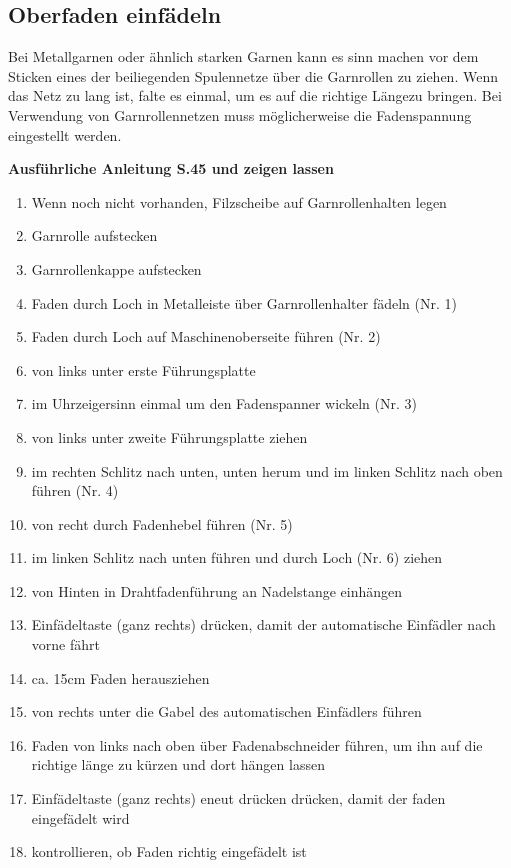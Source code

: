 \documentclass{\basedir/fablab-document}
\begin{document}
\subsection{Oberfaden einfädeln}

Bei Metallgarnen oder ähnlich starken Garnen kann es sinn machen vor dem Sticken eines der beiliegenden Spulennetze über die Garnrollen zu ziehen. Wenn das Netz zu lang ist, falte es einmal, um es auf die richtige Längezu bringen.
Bei Verwendung von Garnrollennetzen muss möglicherweise die Fadenspannung eingestellt werden.

\textbf{Ausführliche Anleitung S.45 und zeigen lassen}
\begin{enumerate}
	\item Wenn noch nicht vorhanden, Filzscheibe auf Garnrollenhalten legen
	\item Garnrolle aufstecken
	\item Garnrollenkappe aufstecken
	\item Faden durch Loch in Metalleiste über Garnrollenhalter fädeln (Nr. 1)
	\item Faden durch Loch auf Maschinenoberseite führen (Nr. 2)
	\item von links unter erste Führungsplatte 
	\item im Uhrzeigersinn einmal um den Fadenspanner wickeln (Nr. 3)
	\item von links unter zweite Führungsplatte ziehen
	\item im rechten Schlitz nach unten, unten herum und im linken Schlitz nach oben führen (Nr. 4)
	\item von recht durch Fadenhebel führen (Nr. 5)
	\item im linken Schlitz nach unten führen und durch Loch (Nr. 6) ziehen
	\item von Hinten in Drahtfadenführung an Nadelstange einhängen
	\item Einfädeltaste (ganz rechts) drücken, damit der automatische Einfädler nach vorne fährt
	\item ca. 15cm Faden herausziehen
	\item von rechts unter die Gabel des automatischen Einfädlers führen
	\item Faden von links nach oben über Fadenabschneider führen, um ihn auf die richtige länge zu kürzen und dort hängen lassen
	\item Einfädeltaste (ganz rechts) eneut drücken drücken, damit der faden eingefädelt wird
	\item kontrollieren, ob Faden richtig eingefädelt ist
\end{enumerate}
\end{document}
